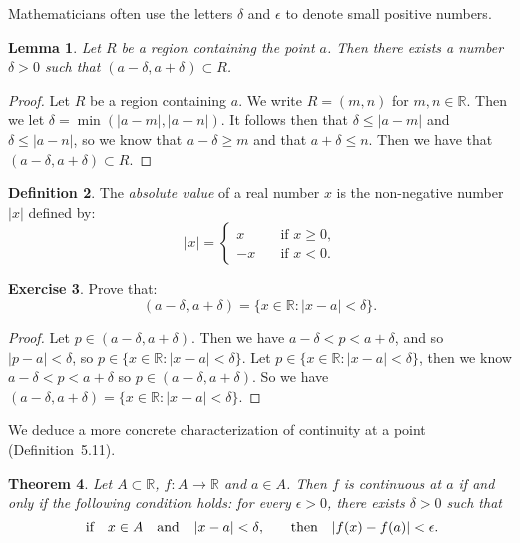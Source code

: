 \documentclass[12pt]{article}
\newcommand{\bbR}{\mathbb{R}}
\providecommand{\abs}[1]{\lvert #1 \rvert}
\renewcommand{\_}[1]{\underline{ #1 }}
\newtheorem{theorem}{Theorem}[section]
\newtheorem{lemma}[theorem]{Lemma}
\theoremstyle{definition}
\newtheorem{definition}[theorem]{Definition}
\newtheorem{exercise}[theorem]{Exercise}
\numberwithin{equation}{subsection}
\begin{document}
Mathematicians often use the letters $\delta$ and $\epsilon$ to denote small positive numbers.

\begin{lemma}  Let $R$ be a region containing the point $a$.  Then there exists a number $\delta > 0$ such that $(a - \delta, a + \delta) \subset R$.
\end{lemma}

\begin{proof}
Let $R$ be a region containing $a$. We write $R = (m,n)$ for $m,n \in \bbR$. Then we let $\delta = \min(|a - m|, |a-n|)$. It follows then that $\delta \leq |a-m|$ and $\delta \leq |a-n|$, so we know that $a - \delta \geq m$ and that $a + \delta \leq n$. Then we have that $(a - \delta, a + \delta) \subset R$. 
\end{proof}

\begin{definition}
The {\em absolute value} of a real number $x$ is the non-negative number $\abs{x}$ defined by:
\[
\abs{x} = \begin{cases}
x \quad &\text{if $x \geq 0$,} \\
-x \quad &\text{if $x < 0$.} 
\end{cases}
\]
\end{definition}

\begin{exercise}  Prove that:
\[
(a - \delta, a + \delta) = \{ x \in \mathbb{R} : \abs{x - a} < \delta \}.
\]
\end{exercise}

\begin{proof}
Let $p \in (a - \delta, a + \delta)$. Then we have $a - \delta < p < a + \delta$, and so $|p - a| < \delta$, so $p \in \{ x \in \mathbb{R} : \abs{x - a} < \delta \}$. \newline
Let $p \in \{ x \in \mathbb{R} : \abs{x - a} < \delta \}$, then we know $a - \delta < p < a + \delta$ so $p \in (a - \delta, a +\delta)$. \newline
So we have $(a - \delta, a + \delta) = \{ x \in \mathbb{R} : \abs{x - a} < \delta \}$.
\end{proof}
We deduce a more concrete characterization of continuity at a point (Definition~5.11).

\begin{theorem}
Let $A\subset\bbR$, $f:A\to\bbR$ and $a\in A$.
Then $f$ is continuous at $a$ if and only if the following condition holds: for every $\epsilon > 0$, there exists $\delta > 0$ such that
\[
\text{ if\quad $x\in A$\quad and\quad $\abs{x - a} < \delta$,\qquad then\quad $\abs{f(x) - f(a)} < \epsilon$.}
\]
\end{theorem}
\end{document}
